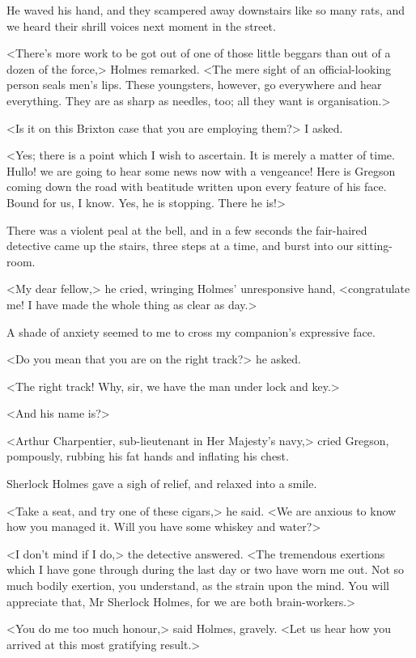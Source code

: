 He waved his hand, and they scampered away downstairs like so many rats, and we heard their shrill voices next moment in the street.

<There's more work to be got out of one of those little beggars than out of a dozen of the force,> Holmes remarked. <The mere sight of an official-looking person seals men's lips. These youngsters, however, go everywhere and hear everything. They are as sharp as needles, too; all they want is organisation.>

<Is it on this Brixton case that you are employing them?> I asked.

<Yes; there is a point which I wish to ascertain. It is merely a matter of time. Hullo! we are going to hear some news now with a vengeance! Here is Gregson coming down the road with beatitude written upon every feature of his face. Bound for us, I know. Yes, he is stopping. There he is!>

There was a violent peal at the bell, and in a few seconds the fair-haired detective came up the stairs, three steps at a time, and burst into our sitting-room.

<My dear fellow,> he cried, wringing Holmes' unresponsive hand, <congratulate me! I have made the whole thing as clear as day.>

A shade of anxiety seemed to me to cross my companion's expressive face.

<Do you mean that you are on the right track?> he asked.

<The right track! Why, sir, we have the man under lock and key.>

<And his name is?>

<Arthur Charpentier, sub-lieutenant in Her Majesty's navy,> cried Gregson, pompously, rubbing his fat hands and inflating his chest.

Sherlock Holmes gave a sigh of relief, and relaxed into a smile.

<Take a seat, and try one of these cigars,> he said. <We are anxious to know how you managed it. Will you have some whiskey and water?>

<I don't mind if I do,> the detective answered. <The tremendous exertions which I have gone through during the last day or two have worn me out. Not so much bodily exertion, you understand, as the strain upon the mind. You will appreciate that, Mr Sherlock Holmes, for we are both brain-workers.>

<You do me too much honour,> said Holmes, gravely. <Let us hear how you arrived at this most gratifying result.>

